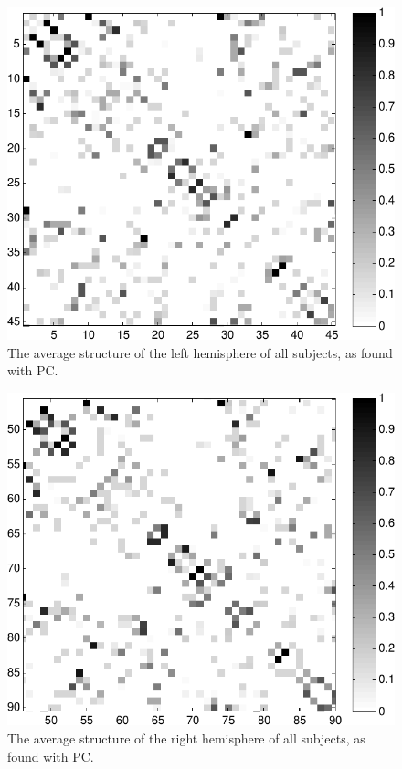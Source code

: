 \documentclass[a4paper, 10pt, english, onecolumn]{article}
\begin{document}
\begin{figure}[h!]
  \centering
  \includegraphics{images/struct_hemisphere_1_45}
  \caption{The average structure of the left hemisphere of all subjects, as found with PC.}
  \label{fig:struct_left}
\end{figure}
\begin{figure}[h!]
  \centering
  \includegraphics{images/struct_hemisphere_46_90}
  \caption{The average structure of the right hemisphere of all subjects, as found with PC.}
  \label{fig:struct_right}
\end{figure}
\end{document}
